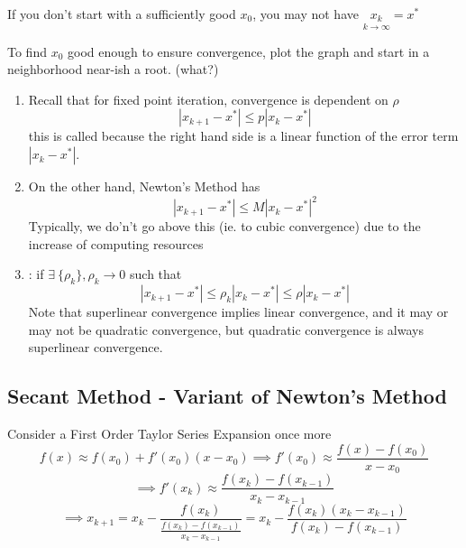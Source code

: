 \documentclass[12pt]{scrartcl}
\begin{document}
\begin{note}
  If you don't start with a sufficiently good $x_0$, you may not have $\underset{k\to\infty}{x_k} = x^*$
\end{note}

\begin{note}
  To find $x_0$ good enough to ensure convergence, plot the graph and start in a neighborhood 
  near-ish a root. (what?)
\end{note}

\begin{note}
  \hfill

  \begin{enumerate}
    \item Recall that for fixed point iteration, convergence is dependent on $\rho$ 
  \[|x_{k+1} - x^*| \leq p|x_k - x^*|\]
  this is called  because the right hand side is a linear function of the error term $|x_k - x^*|$. 
    \item On the other hand, Newton's Method has 
    \[|x_{k+1} - x^*| \leq M|x_k - x^*|^2\]
    Typically, we do'n't go above this (ie. to cubic convergence) due to the increase of computing resources
    \item {}: if $\exists \ \{\rho_k\}, \rho_k \to 0$ such that 
    \[|x_{k+1} - x^*| \leq \rho_k|x_k - x^*| \leq \rho|x_k - x^*|\]
    Note that superlinear convergence implies linear convergence, and it may or may not be quadratic convergence,
    but quadratic convergence is always superlinear convergence.
  \end{enumerate}
\end{note}

\subsection{Secant Method - Variant of Newton's Method}

\begin{definition}
  Consider a First Order Taylor Series Expansion once more
  \[f(x) \approx f(x_0) + f'(x_0)(x-x_0) \implies f'(x_0) \approx \frac{f(x) - f(x_0)}{x-x_0}\]
  \[\implies f'(x_k) \approx \frac{f(x_k) - f(x_{k-1})}{x_k - x_{k-1}}\]
  \[\implies x_{k+1} = x_k - \frac{f(x_k)}{\frac{f(x_k) - f(x_{k-1})}{x_k - x_{k-1}}} = x_k - \frac{f(x_k)(x_k - x_{k-1})}{f(x_k) - f(x_{k-1})}\]
\end{definition}
\end{document}

